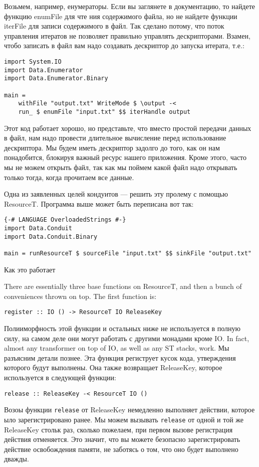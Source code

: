 Возьмем, например, енумераторы. Если вы заглянете в документацию, то найдете функцию
enumFile для чте ния содержимого файла, но не найдете функции iterFile для записи
содержимого в файл. Так сделано потому, что поток управления итератов не позволяет
правильно управлять дескрипторами. Взамен, чтобо записать в файл вам надо создавать
дескриптор до запуска итерата, т.е.: 

\begin{verbatim}
import System.IO
import Data.Enumerator
import Data.Enumerator.Binary

main =
    withFile "output.txt" WriteMode $ \output -<
    run_ $ enumFile "input.txt" $$ iterHandle output
\end{verbatim}

Этот код работает хорошо, но представьте, что вместо простой передачи данных в файл, нам
надо провести длительное вычисление перед использование дескриптора. Мы будем иметь
дескриптор задолго до того, как он нам понадобится, блокируя важный ресурс нашего
приложения. Кроме этого, часто мы не можем открыть файл, так как мы поймем какой файл
надо открывать только тогда, когда прочитаем все данные.

Одна из заявленных целей кондуитов --- решить эту пролему с помощью ResourceT. Программа
выше может быть переписана вот так:
\begin{verbatim}
{-# LANGUAGE OverloadedStrings #-}
import Data.Conduit
import Data.Conduit.Binary

main = runResourceT $ sourceFile "input.txt" $$ sinkFile "output.txt"
\end{verbatim}

Как это работает

There are essentially three base functions on ResourceT, and then a bunch of
conveniences thrown on top. The first function is:
\begin{verbatim}
register :: IO () -> ResourceT IO ReleaseKey
\end{verbatim}
Полииморфность этой функции и остальных ниже не используется в полную силу, на самом деле
они могут работать с другими монадами кроме IO. In fact, almost any transformer on top of
IO, as well as any ST stacks, work. Мы разъясним детали познее.
Эта функция региструет кусок кода, утверждения которого будут выполнены. Она также
возвращает ReleaseKey, которое используется в следующей функции:
\begin{verbatim}release :: ReleaseKey -< ResourceT IO ()
\end{verbatim}
Возоы функции \verb=release= от ReleaseKey немедленно выполняет действии, которое ыло
зарегистрировано ранее. Мы можем вызывать \verb=release= от одной и той же ReleaseKey
стольк раз, сколько пожелаем, при первом вызове регистрация действия отменяется. Это
значит, что вы можете безопасно зарегистрировать действие освобождения памяти, не
заботясь о том, что оно будет выполнено дважды.

